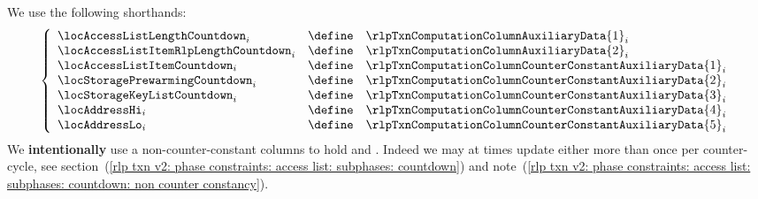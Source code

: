 \begin{center}
\end{center}
We use the following shorthands:
\[
	\left\{ \begin{array}{lcl}
		\locAccessListLengthCountdown        _{i} & \define & \rlpTxnComputationColumnAuxiliaryData{1}                _{i} \\
		\locAccessListItemRlpLengthCountdown _{i} & \define & \rlpTxnComputationColumnAuxiliaryData{2}                _{i} \\
		\locAccessListItemCountdown       _{i} & \define & \rlpTxnComputationColumnCounterConstantAuxiliaryData{1} _{i} \\
		\locStoragePrewarmingCountdown       _{i} & \define & \rlpTxnComputationColumnCounterConstantAuxiliaryData{2} _{i} \\
		\locStorageKeyListCountdown          _{i} & \define & \rlpTxnComputationColumnCounterConstantAuxiliaryData{3} _{i} \\
		\locAddressHi                        _{i} & \define & \rlpTxnComputationColumnCounterConstantAuxiliaryData{4} _{i} \\
		\locAddressLo                        _{i} & \define & \rlpTxnComputationColumnCounterConstantAuxiliaryData{5} _{i} \\
	\end{array}                            \right.
\]
\saNote{}
We \textbf{intentionally} use a non-counter-constant columns
to hold
\locAccessListLengthCountdown{} and
\locAccessListItemRlpLengthCountdown{}.
Indeed we may at times update either
more than once per counter-cycle,
see section~(\ref{rlp txn v2: phase constraints: access list: subphases: countdown}) and
note~(\ref{rlp txn v2: phase constraints: access list: subphases: countdown: non counter constancy}).
